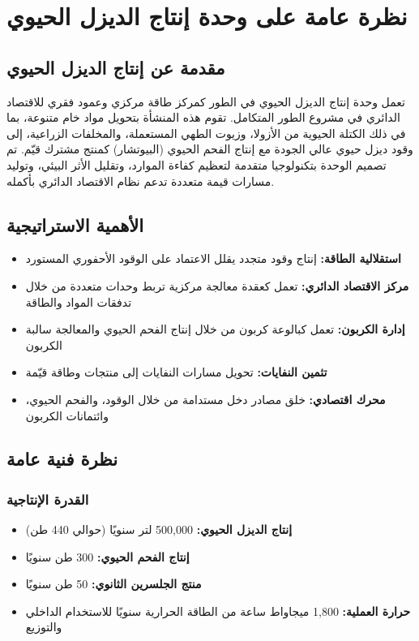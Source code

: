 \section{نظرة عامة على وحدة إنتاج الديزل الحيوي}

\subsection{مقدمة عن إنتاج الديزل الحيوي}
تعمل وحدة إنتاج الديزل الحيوي في الطور كمركز طاقة مركزي وعمود فقري للاقتصاد الدائري في مشروع الطور المتكامل. تقوم هذه المنشأة بتحويل مواد خام متنوعة، بما في ذلك الكتلة الحيوية من الأزولا، وزيوت الطهي المستعملة، والمخلفات الزراعية، إلى وقود ديزل حيوي عالي الجودة مع إنتاج الفحم الحيوي (البيوتشار) كمنتج مشترك قيّم. تم تصميم الوحدة بتكنولوجيا متقدمة لتعظيم كفاءة الموارد، وتقليل الأثر البيئي، وتوليد مسارات قيمة متعددة تدعم نظام الاقتصاد الدائري بأكمله.

\subsection{الأهمية الاستراتيجية}
\begin{itemize}
    \item \textbf{استقلالية الطاقة:} إنتاج وقود متجدد يقلل الاعتماد على الوقود الأحفوري المستورد
    \item \textbf{مركز الاقتصاد الدائري:} تعمل كعقدة معالجة مركزية تربط وحدات متعددة من خلال تدفقات المواد والطاقة
    \item \textbf{إدارة الكربون:} تعمل كبالوعة كربون من خلال إنتاج الفحم الحيوي والمعالجة سالبة الكربون
    \item \textbf{تثمين النفايات:} تحويل مسارات النفايات إلى منتجات وطاقة قيّمة
    \item \textbf{محرك اقتصادي:} خلق مصادر دخل مستدامة من خلال الوقود، والفحم الحيوي، وائتمانات الكربون
\end{itemize}

\subsection{نظرة فنية عامة}

\subsubsection{القدرة الإنتاجية}
\begin{itemize}
    \item \textbf{إنتاج الديزل الحيوي:} 500,000 لتر سنويًا (حوالي 440 طن)
    \item \textbf{إنتاج الفحم الحيوي:} 300 طن سنويًا
    \item \textbf{منتج الجلسرين الثانوي:} 50 طن سنويًا
    \item \textbf{حرارة العملية:} 1,800 ميجاواط ساعة من الطاقة الحرارية سنويًا للاستخدام الداخلي والتوزيع
\end{itemize}

